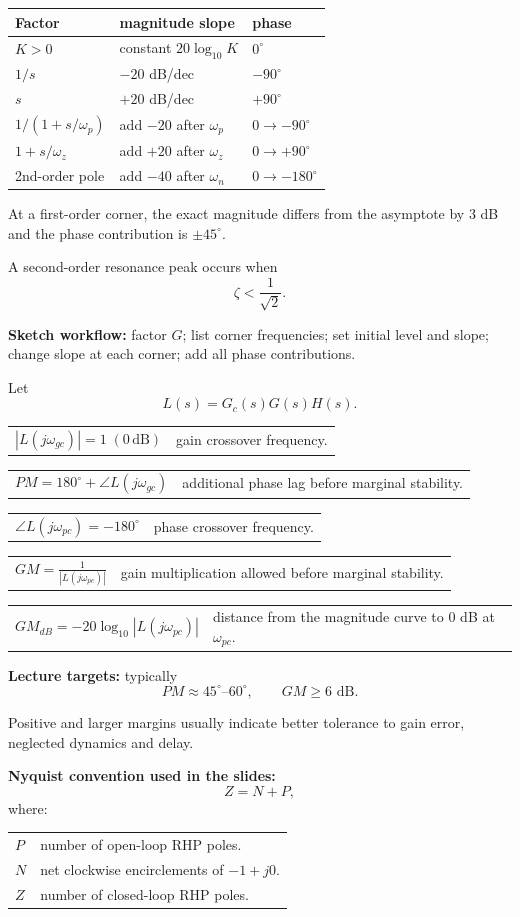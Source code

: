 \documentclass[a4paper,8pt]{extarticle}
\makeatletter
\newcommand{\topicdot}[1]{\tikz[baseline=-0.6ex]\fill[#1] (0,0) circle (0.52ex);}
\newcommand{\Fdot}{\topicdot{freqDot}}
\newcommand{\mybox}[2]{
\begin{tcolorbox}[
  enhanced,
  colback=lightblue!7!white,
  colframe=lightblue!78!black,
  boxrule=0.38pt,
  boxsep=0.7pt,
  left=1.7pt,right=1.7pt,top=1.5pt,bottom=1.5pt,
  arc=0.8pt,outer arc=0.8pt,
  title={\small\textbf{#1}},
  fonttitle=\bfseries,
  coltitle=black,
  before skip=1.5pt,after skip=1.5pt,
  fontupper=\fontsize{5.55pt}{6.30pt}\selectfont\RaggedRight
]
#2
\end{tcolorbox}}
\newcommand{\frow}[2]{%
\begin{tabularx}{\linewidth}{@{}>{$\displaystyle}l<{$}@{\hspace{3pt}}X@{}}
#1 & #2
\end{tabularx}\vspace{0.3pt}}
\newcommand{\tinyhead}[1]{\textbf{#1}\;}
\makeatother
\begin{document}
\begin{multicols}{3}
{\begin{tabularx}{\linewidth}{@{}lXX@{}}
Factor & magnitude slope & phase\\\midrule
$K>0$ & constant $20\log_{10}K$ & $0^\circ$\\
$1/s$ & $-20$ dB/dec & $-90^\circ$\\
$s$ & $+20$ dB/dec & $+90^\circ$\\
$1/(1+s/\omega_p)$ & add $-20$ after $\omega_p$ & $0\to-90^\circ$\\
$1+s/\omega_z$ & add $+20$ after $\omega_z$ & $0\to+90^\circ$\\
2nd-order pole & add $-40$ after $\omega_n$ & $0\to-180^\circ$\\
\end{tabularx}

At a first-order corner, the exact magnitude differs from the asymptote by $3$ dB and the phase contribution is $\pm45^\circ$.

A second-order resonance peak occurs when
\[
\zeta<\frac{1}{\sqrt2}.
\]

\tinyhead{Sketch workflow:}
factor $G$; list corner frequencies; set initial level and slope; change slope at each corner; add all phase contributions.
}

\mybox{GM, PM, Nyquist \& Robustness \Fdot}{
Let
\[
L(s)=G_c(s)G(s)H(s).
\]

\frow{|L(j\omega_{gc})|=1\;(0\,\mathrm{dB})}
{gain crossover frequency.}

\frow{PM=180^\circ+\angle L(j\omega_{gc})}
{additional phase lag before marginal stability.}

\frow{\angle L(j\omega_{pc})=-180^\circ}
{phase crossover frequency.}

\frow{GM=\frac{1}{|L(j\omega_{pc})|}}
{gain multiplication allowed before marginal stability.}

\frow{GM_{dB}=-20\log_{10}|L(j\omega_{pc})|}
{distance from the magnitude curve to $0$ dB at $\omega_{pc}$.}

\tinyhead{Lecture targets:}
typically
\[
PM\approx45^\circ\text{--}60^\circ,
\qquad
GM\geq6\text{ dB}.
\]

Positive and larger margins usually indicate better tolerance to gain error, neglected dynamics and delay.

\tinyhead{Nyquist convention used in the slides:}
\[
Z=N+P,
\]
where:

\begin{tabularx}{\linewidth}{@{}lX@{}}
$P$ & number of open-loop RHP poles.\\
$N$ & net clockwise encirclements of $-1+j0$.\\
$Z$ & number of closed-loop RHP poles.\\
\end{tabularx}

}
\end{multicols}
\end{document}
